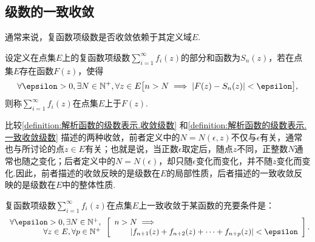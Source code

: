 \subsection{级数的一致收敛}
通常来说，复函数项级数是否收敛依赖于其定义域\(E\).
\begin{definition}\label{definition:解析函数的级数表示.一致收敛级数}
设定义在点集\(E\)上的复函数项级数\(\sum\limits_{i=1}^\infty f_i(z)\)的部分和函数为\(S_n(z)\)，若在点集\(E\)存在函数\(F(z)\)，使得\[
\forall\epsilon>0,
\exists N \in \mathbb{N}^+,
\forall z \in E
\bigl[
	n>N \implies \abs{F(z) - S_n(z)} < \epsilon
\bigr],
\]则称\(\sum\limits_{i=1}^\infty f_i(z)\)在点集\(E\)上于\(F(z)\).
\end{definition}

比较\cref{definition:解析函数的级数表示.收敛级数} 和\cref{definition:解析函数的级数表示.一致收敛级数} 描述的两种收敛，前者定义中的\(N = N(\epsilon, z)\)不仅与\(\epsilon\)有关，通常也与所讨论的点\(z \in E\)有关；也就是说，当正数\(\epsilon\)取定后，随点\(z\)不同，正整数\(N\)通常也随之变化；后者定义中的\(N = N(\epsilon)\)，却只随\(\epsilon\)变化而变化，并不随\(z\)变化而变化.因此，前者描述的收敛反映的是级数在\(E\)的局部性质，后者描述的一致收敛反映的是级数在\(E\)中的整体性质.

\begin{theorem}[柯西一致收敛准则]\label{theorem:无穷级数.柯西一致收敛准则}
复函数项级数\(\sum\limits_{i=1}^\infty f_i(z)\)在点集\(E\)上一致收敛于某函数的充要条件是：\[
\begin{array}{r}
\forall\epsilon>0,
\exists N \in \mathbb{N}^+, \\
\forall z \in E,
\forall p \in \mathbb{N}^+
\end{array}
\left[
\begin{array}{l}
n > N \implies \\
\hspace{20pt}
\abs{f_{n+1}(z) + f_{n+2}(z) + \dotsb + f_{n+p}(z)} < \epsilon
\end{array}
\right].
\]
\end{theorem}

